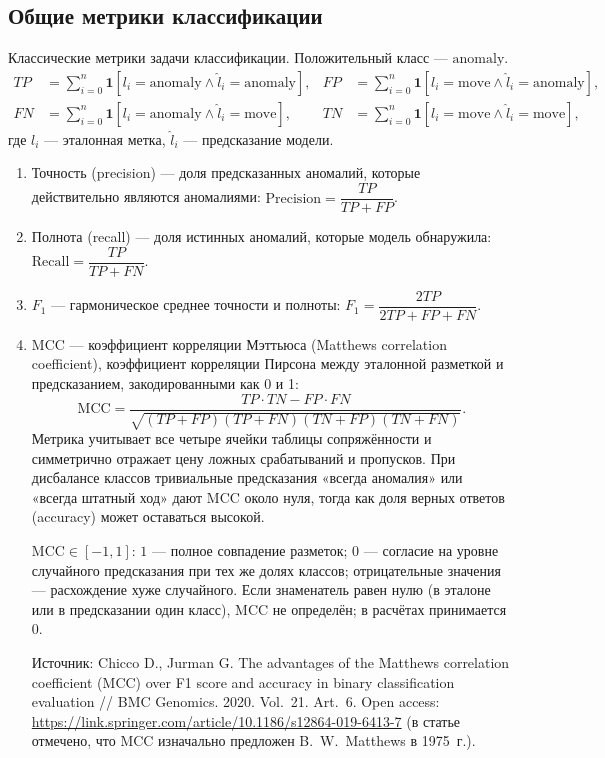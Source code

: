 \documentclass[a4paper,12pt]{report}
\begin{document}
	\subsection{Общие метрики классификации}
	Классические метрики задачи классификации. Положительный класс --- $\mathrm{anomaly}$.
	\begin{align*}
		TP&=\sum_{i=0}^{n}\mathbf{1}[l_i=\mathrm{anomaly}\land\hat{l}_i=\mathrm{anomaly}], &
		FP&=\sum_{i=0}^{n}\mathbf{1}[l_i=\mathrm{move}\land\hat{l}_i=\mathrm{anomaly}],\\
		FN&=\sum_{i=0}^{n}\mathbf{1}[l_i=\mathrm{anomaly}\land\hat{l}_i=\mathrm{move}], &
		TN&=\sum_{i=0}^{n}\mathbf{1}[l_i=\mathrm{move}\land\hat{l}_i=\mathrm{move}],
	\end{align*}
	где $l_i$ --- эталонная метка, $\hat{l}_i$ --- предсказание модели.
	\begin{enumerate}
		\item Точность (precision) --- доля предсказанных аномалий, которые действительно являются аномалиями:
		$\mathrm{Precision}=\dfrac{TP}{TP+FP}$.
		\item Полнота (recall) --- доля истинных аномалий, которые модель обнаружила:
		$\mathrm{Recall}=\dfrac{TP}{TP+FN}$.
		\item $F_1$ --- гармоническое среднее точности и полноты:
		$F_1=\dfrac{2TP}{2TP+FP+FN}$.
		\item MCC --- коэффициент корреляции Мэттьюса (Matthews correlation coefficient), коэффициент корреляции Пирсона между эталонной разметкой и предсказанием, закодированными как 0 и 1:
		\[
		\mathrm{MCC}=\dfrac{TP\cdot TN-FP\cdot FN}{\sqrt{(TP+FP)(TP+FN)(TN+FP)(TN+FN)}}.
		\]
		Метрика учитывает все четыре ячейки таблицы сопряжённости и симметрично отражает цену ложных срабатываний и пропусков. При дисбалансе классов тривиальные предсказания «всегда аномалия» или «всегда штатный ход» дают MCC около нуля, тогда как доля верных ответов (accuracy) может оставаться высокой.

		$\mathrm{MCC}\in[-1,1]$: $1$ --- полное совпадение разметок; $0$ --- согласие на уровне случайного предсказания при тех же долях классов; отрицательные значения --- расхождение хуже случайного. Если знаменатель равен нулю (в эталоне или в предсказании один класс), MCC не определён; в расчётах принимается $0$.

		Источник: Chicco D., Jurman G. The advantages of the Matthews correlation coefficient (MCC) over F1 score and accuracy in binary classification evaluation // BMC Genomics. 2020. Vol.~21. Art.~6. Open access: \url{https://link.springer.com/article/10.1186/s12864-019-6413-7} (в статье отмечено, что MCC изначально предложен B.~W.~Matthews в 1975~г.).
	\end{enumerate}
\end{document}
